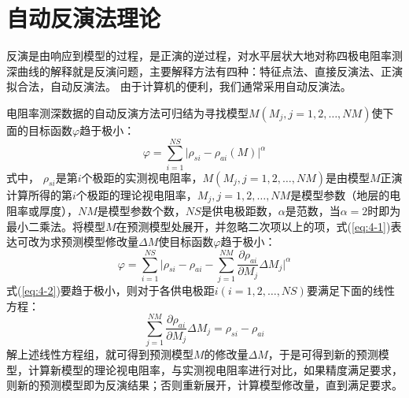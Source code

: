 \documentclass[hyperref,UTF-8,twoside]{ctexart}
\newcommand*\bigglabs[1]{\biggl\lvert#1\biggl\rvert}
\numberwithin{equation}{section}
\begin{document}
\section{自动反演法理论}
反演是由响应到模型的过程，是正演的逆过程，对水平层状大地对称四极电阻率测深曲线的解释就是反演问题，主要解释方法有四种：特征点法、直接反演法、正演拟合法，自动反演法。
由于计算机的便利，我们通常采用自动反演法。

电阻率测深数据的自动反演方法可归结为寻找模型$M(M_j,j=1,2,\ldots,NM)$使下面的目标函数$\varphi$趋于极小：
\begin{equation}
\varphi=\sum_{i=1}^{NS}\bigglabs{\rho_{si}-\rho_{ai}(M)}^\alpha\label{eq:4-1}
\end{equation}
式中， $\rho_{si}$是第$i$个极距的实测视电阻率，$M(M_j,j=1,2,\ldots,NM)$是由模型$M$正演计算所得的第$i$个极距的理论视电阻率，$M_j,j=1,2,\ldots,NM$是模型参数（地层的电阻率或厚度），$NM$是模型参数个数，$NS$是供电极距数，$\alpha$是范数，当$\alpha=2$时即为最小二乘法。将模型$M$在预测模型处展开，并忽略二次项以上的项，式(\ref{eq:4-1})表达可改为求预测模型修改量$\Delta M$使目标函数$\varphi$趋于极小：
\begin{equation}
\varphi=\sum_{i=1}^{NS}\bigglabs{\rho_{si}-\rho_{ai}-\sum_{j=1}^{NM}\frac{\partial \rho_{ai}}{\partial M_j}\Delta M_j}^\alpha\label{eq:4-2}
\end{equation}
式(\ref{eq:4-2})要趋于极小，则对于各供电极距$i(i=1,2,\ldots,NS)$要满足下面的线性方程：
\begin{equation}
\sum_{j=1}^{NM}\frac{\partial \rho_{ai}}{\partial M_{j}}\Delta M_j=\rho_{si}-\rho_{ai}\label{eq:4-3}
\end{equation}
解上述线性方程组，就可得到预测模型$M$的修改量$\Delta M$，于是可得到新的预测模型，计算新模型的理论视电阻率，与实测视电阻率进行对比，如果精度满足要求，则新的预测模型即为反演结果；否则重新展开，计算模型修改量，直到满足要求。
\end{document}
